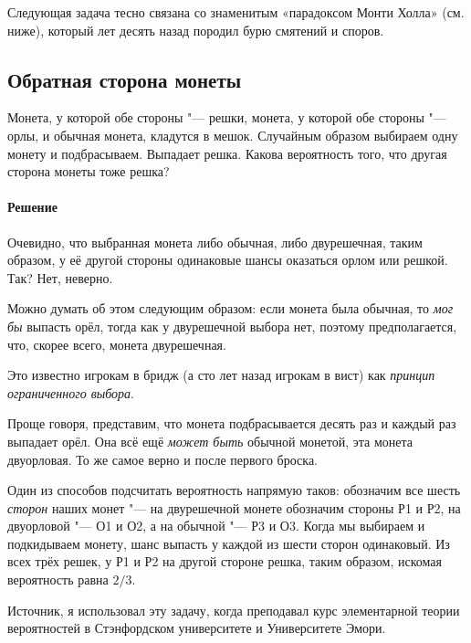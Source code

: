 \documentclass[twoside]{book}
\makeatletter
\newcommand{\rindex}[2][\imki@jobname]{%
  \index[#1]{\detokenize{#2}}%
}
\makeatother
\begin{document}
\medskip

Следующая задача тесно связана со знаменитым «парадоксом Монти Холла» (см. ниже), который лет десять назад породил бурю смятений и споров.

\subsection*{Обратная сторона монеты}%
\rindex{Обратная сторона монеты}

Монета, у которой обе стороны "--- решки, монета, у которой обе стороны "--- орлы, и обычная монета, кладутся в мешок.
Случайным образом выбираем одну монету и подбрасываем.
Выпадает решка.
Какова вероятность того, что другая сторона монеты тоже решка?

\paragraph{Решение}
Очевидно, что выбранная монета либо обычная, либо двурешечная, таким образом, у её другой стороны одинаковые шансы оказаться орлом или решкой.
Так?
Нет, неверно.

Можно думать об этом следующим образом: если монета была обычная, то \emph{мог бы} выпасть орёл, тогда как у двурешечной выбора нет, поэтому предполагается, что, скорее всего, монета двурешечная.

Это известно игрокам в бридж (а сто лет назад игрокам в вист) как \emph{принцип ограниченного выбора}.

Проще говоря, представим, что монета подбрасывается десять раз и каждый раз выпадает орёл.
Она всё ещё \emph{может быть} обычной монетой,  эта монета двуорловая.
То же самое верно и после первого броска.

Один из способов подсчитать вероятность напрямую таков:
обозначим все шесть \emph{сторон} наших монет "---
на двурешечной монете обозначим стороны Р1 и Р2, на двуорловой "--- О1 и О2, а на обычной "--- Р3 и О3.
Когда мы выбираем и подкидываем монету, шанс выпасть у каждой из шести сторон одинаковый.
Из всех трёх решек, у Р1 и Р2 на другой стороне решка, таким образом, искомая вероятность равна $2/3$.\heart

\medskip
{\small 
Источник, я использовал эту задачу, когда преподавал курс элементарной теории вероятностей в Стэнфордском университете и Университете Эмори.

}
\medskip
\end{document}
